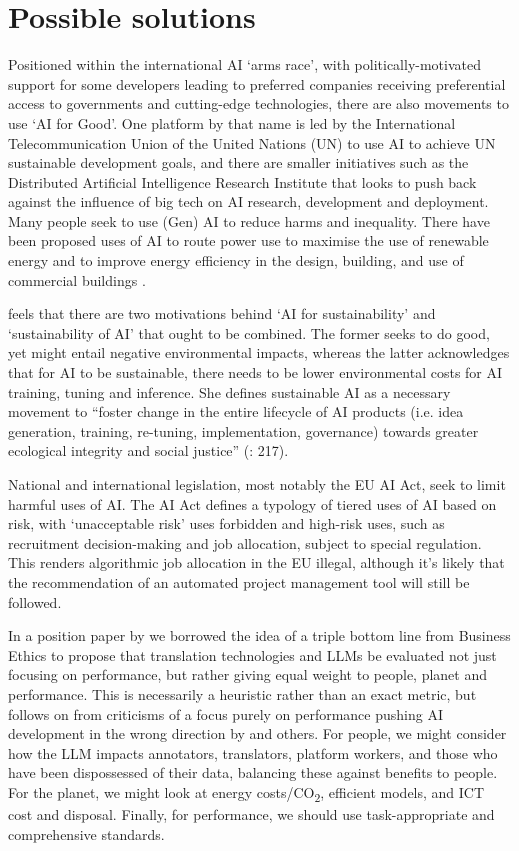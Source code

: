\documentclass[output=paper]{langscibook}
\begin{document}
\section{Possible solutions}\label{sec:6:4}
Positioned within the international AI ‘arms race’, with politically-motivated support for some developers leading to preferred companies receiving preferential access to governments and cutting-edge technologies, there are also movements to use ‘AI for Good’. One platform by that name is led by the International Telecommunication Union of the United Nations (UN) to use AI to achieve UN sustainable development goals, and there are smaller initiatives such as the Distributed Artificial Intelligence Research Institute that looks to push back against the influence of big tech on AI research, development and deployment. Many people seek to use (Gen) AI to reduce harms and inequality. There have been proposed uses of AI to route power use to maximise the use of renewable energy and to improve energy efficiency in the design, building, and use of commercial buildings \citep{ding_potential_2024}.

 \citet{van_wynsberghe_sustainable_2021} feels that there are two motivations behind ‘AI for sustainability’ and ‘sustainability of AI’ that ought to be combined. The former seeks to do good, yet might entail negative environmental impacts, whereas the latter acknowledges that for AI to be sustainable, there needs to be lower environmental costs for AI training, tuning and inference. She defines sustainable AI as a necessary movement to “foster change in the entire lifecycle of AI products (i.e. idea generation, training, re-tuning, implementation, governance) towards greater ecological integrity and social justice” (\citealt{van_wynsberghe_sustainable_2021}: 217).

National and international legislation, most notably the EU AI Act, seek to limit harmful uses of AI. The AI Act defines a typology of tiered uses of AI based on risk, with ‘unacceptable risk’ uses forbidden and high-risk uses, such as recruitment decision-making and job allocation, subject to special regulation. This renders algorithmic job allocation in the EU illegal, although it’s likely that the recommendation of an automated project management tool will still be followed. 

In a position paper by \citet{moorkens2024_triple} we borrowed the idea of a triple bottom line from Business Ethics \citep{elkington_cannibals} to propose that translation technologies and LLMs be evaluated not just focusing on performance, but rather giving equal weight to people, planet and performance. This is necessarily a heuristic rather than an exact metric, but follows on from criticisms of a focus purely on performance pushing AI development in the wrong direction by \citet{schwartz2020} and others. For people, we might consider how the LLM impacts annotators, translators, platform workers, and those who have been dispossessed of their data, balancing these against benefits to people. For the planet, we might look at energy costs/CO\textsubscript{2}, efficient models, and ICT cost and disposal. Finally, for performance, we should use task-appropriate and comprehensive standards.
\end{document}
